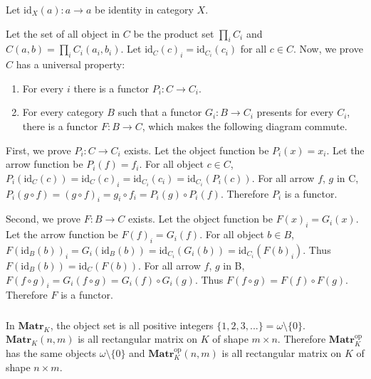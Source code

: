 \documentclass{article}
\begin{document}
\showArt

Let $\mathrm{id}_X(a) : a \rightarrow a$ be identity in category $X$.

Let the set of all object in $C$ be the product set $\prod_i C_i$ and $C(a, b) = \prod_i C_i(a_i, b_i)$. Let $\mathrm{id}_C(c)_i = \mathrm{id}_{C_i}(c_i)$ for all $c \in C$. Now, we prove $C$ has a universal property:

\begin{enumerate}
\item For every $i$ there is a functor $P_i : C \rightarrow C_i$.
\item For every category $B$ such that a functor $G_i : B \rightarrow C_i$ presents for every $C_i$, there is a functor $F : B \rightarrow C$, which makes the following diagram commute.

\begin{center}
\end{center}
\end{enumerate}

First, we prove $P_i : C \rightarrow C_i$ exists. Let the object function be $P_i(x) = x_i$. Let the arrow function be $P_i(f) = f_i$. For all object $c \in C$, $P_i(\mathrm{id}_C(c)) = \mathrm{id}_C(c)_i = \mathrm{id}_{C_i}(c_i) = \mathrm{id}_{C_i}(P_i(c))$. For all arrow $f$, $g$ in C, $P_i(g \circ f) = (g \circ f)_i = g_i \circ f_i =  P_i(g) \circ P_i(f)$. Therefore $P_i$ is a functor.

Second, we prove $F : B \rightarrow C$ exists. Let the object function be $F(x)_i = G_i(x)$. Let the arrow function be $F(f)_i = G_i(f)$. For all object $b \in B$, $F(\mathrm{id}_B(b))_i = G_i(\mathrm{id}_B(b)) =  \mathrm{id}_{C_i}(G_i(b)) = \mathrm{id}_{C_i}(F(b)_i)$. Thus $F(\mathrm{id}_B(b)) = \mathrm{id}_{C}(F(b))$. For all arrow $f$, $g$ in B, $F(f \circ g)_i = G_i(f \circ g) = G_i(f) \circ G_i(g)$. Thus $F(f \circ g) = F(f) \circ F(g)$. Therefore $F$ is a functor.

\subsubsection{}



\showArt

In $\mathbf{Matr}_K$, the object set is all positive integers $\{1, 2, 3, ...\} = \omega \setminus \{0\}$. $\mathbf{Matr}_K(n, m)$ is all rectangular matrix on $K$ of shape $m \times n$. Therefore $\mathbf{Matr}_K^{\mathrm{op}}$ has the same objects $\omega \setminus \{0\}$ and  $\mathbf{Matr}_K^{\mathrm{op}}(n, m)$ is all rectangular matrix on $K$ of shape $n \times m$.
\end{document}
